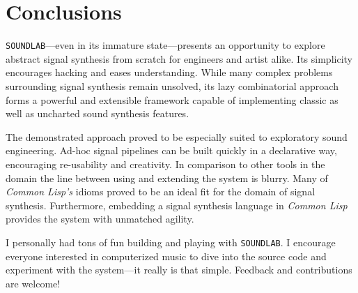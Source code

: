 \section{Conclusions}

\texttt{SOUNDLAB}---even in its immature state---presents an opportunity
to explore abstract signal synthesis from scratch for engineers and artist
alike. Its simplicity encourages hacking and eases understanding. While
many complex problems surrounding signal synthesis remain unsolved, its
lazy combinatorial approach forms a powerful and extensible framework
capable of implementing classic as well as uncharted sound synthesis
features.

The demonstrated approach proved to be especially suited to exploratory
sound engineering. Ad-hoc signal pipelines can be built quickly in a
declarative way, encouraging re-usability and creativity. In comparison to
other tools in the domain the line between using and extending the system
is blurry. Many of \textit{Common Lisp's} idioms proved to be an ideal
fit for the domain of signal synthesis. Furthermore, embedding a signal
synthesis language in \textit{Common Lisp} provides the system with
unmatched agility.

I personally had tons of fun building and playing with \texttt{SOUNDLAB}.
I encourage everyone interested in computerized music to dive into the
source code and experiment with the system---it really is that simple.
Feedback and contributions are welcome!
